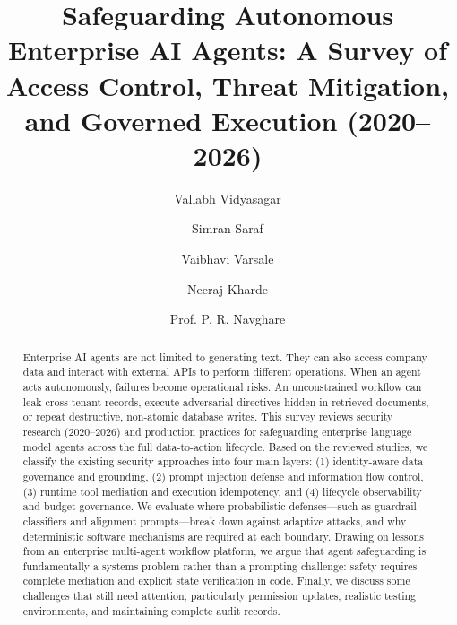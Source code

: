 \documentclass[sigconf]{acmart}
\begin{document}
\title{Safeguarding Autonomous Enterprise AI Agents: A Survey of Access Control, Threat Mitigation, and Governed Execution (2020--2026)}

\author{Vallabh Vidyasagar}

\author{Simran Saraf}

\author{Vaibhavi Varsale}

\author{Neeraj Kharde}

\author{Prof. P. R. Navghare}

\renewcommand{\shortauthors}{Vidyasagar et al.}

\begin{abstract}
Enterprise AI agents are not limited to generating text. They can also access company data and interact with external APIs to perform different operations. When an agent acts autonomously, failures become operational risks. An unconstrained workflow can leak cross-tenant records, execute adversarial directives hidden in retrieved documents, or repeat destructive, non-atomic database writes. This survey reviews security research (2020--2026) and production practices for safeguarding enterprise language model agents across the full data-to-action lifecycle. Based on the reviewed studies, we classify the existing security approaches into four main layers: (1) identity-aware data governance and grounding, (2) prompt injection defense and information flow control, (3) runtime tool mediation and execution idempotency, and (4) lifecycle observability and budget governance. We evaluate where probabilistic defenses—such as guardrail classifiers and alignment prompts—break down against adaptive attacks, and why deterministic software mechanisms are required at each boundary. Drawing on lessons from an enterprise multi-agent workflow platform, we argue that agent safeguarding is fundamentally a systems problem rather than a prompting challenge: safety requires complete mediation and explicit state verification in code. Finally, we discuss some challenges that still need attention, particularly permission updates, realistic testing environments, and maintaining complete audit records.
\end{abstract}
\end{document}
